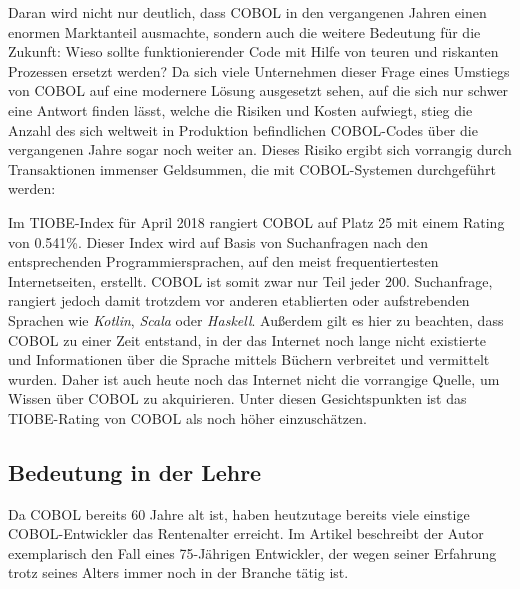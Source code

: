 Daran wird nicht nur deutlich, dass COBOL in den vergangenen Jahren einen enormen Marktanteil ausmachte, sondern auch die weitere Bedeutung für die Zukunft: Wieso sollte funktionierender Code mit Hilfe von teuren und riskanten Prozessen ersetzt werden? Da sich viele Unternehmen dieser Frage eines Umstiegs von COBOL auf eine modernere Lösung ausgesetzt sehen, auf die sich nur schwer eine Antwort finden lässt, welche die Risiken und Kosten aufwiegt, stieg die Anzahl des sich weltweit in Produktion befindlichen COBOL-Codes über die vergangenen Jahre sogar noch weiter an. Dieses Risiko ergibt sich vorrangig durch Transaktionen immenser Geldsummen, die mit COBOL-Systemen durchgeführt werden:  \cite{beat_balzli_cobol-programmierer_2017}

Im TIOBE-Index \cite{_tiobe_} für April 2018 rangiert COBOL auf Platz 25 mit einem Rating von 0.541\%. Dieser Index wird auf Basis von Suchanfragen nach den entsprechenden Programmiersprachen, auf den meist frequentiertesten Internetseiten, erstellt. COBOL ist somit zwar nur Teil jeder 200. Suchanfrage, rangiert jedoch damit trotzdem vor anderen etablierten oder aufstrebenden Sprachen wie \textit{Kotlin}, \textit{Scala} oder \textit{Haskell}. Außerdem gilt es hier zu beachten, dass COBOL zu einer Zeit entstand, in der das Internet noch lange nicht existierte und Informationen über die Sprache mittels Büchern verbreitet und vermittelt wurden. Daher ist auch heute noch das Internet nicht die vorrangige Quelle, um Wissen über COBOL zu akquirieren. Unter diesen Gesichtspunkten ist das TIOBE-Rating von COBOL als noch höher einzuschätzen.


\subsection*{Bedeutung in der Lehre}
Da COBOL bereits 60 Jahre alt ist, haben heutzutage bereits viele einstige COBOL-Entwickler das Rentenalter erreicht. Im Artikel  beschreibt der Autor exemplarisch den Fall eines 75-Jährigen Entwickler, der wegen seiner Erfahrung trotz seines Alters immer noch in der Branche tätig ist.


